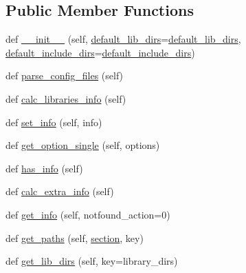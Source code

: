 \subsection*{Public Member Functions}
\begin{DoxyCompactItemize}
\item 
def \hyperlink{classnumpy_1_1distutils_1_1system__info_1_1system__info_aa6306102e4461243e230f7cab008a959}{\+\_\+\+\_\+init\+\_\+\+\_\+} (self, \hyperlink{namespacenumpy_1_1distutils_1_1system__info_ac60e6bb3dff22d8f4f250d1b4ba42899}{default\+\_\+lib\+\_\+dirs}=\hyperlink{namespacenumpy_1_1distutils_1_1system__info_ac60e6bb3dff22d8f4f250d1b4ba42899}{default\+\_\+lib\+\_\+dirs}, \hyperlink{namespacenumpy_1_1distutils_1_1system__info_ad2cd2857056589dcb7cacb98be3d2b20}{default\+\_\+include\+\_\+dirs}=\hyperlink{namespacenumpy_1_1distutils_1_1system__info_ad2cd2857056589dcb7cacb98be3d2b20}{default\+\_\+include\+\_\+dirs})
\item 
def \hyperlink{classnumpy_1_1distutils_1_1system__info_1_1system__info_a4457af93b19f7e8318733c5b2dede3c4}{parse\+\_\+config\+\_\+files} (self)
\item 
def \hyperlink{classnumpy_1_1distutils_1_1system__info_1_1system__info_ac692017a5463945198c8bd0fe8ef2e14}{calc\+\_\+libraries\+\_\+info} (self)
\item 
def \hyperlink{classnumpy_1_1distutils_1_1system__info_1_1system__info_a61172beee26589377a60f315e4941ee5}{set\+\_\+info} (self, info)
\item 
def \hyperlink{classnumpy_1_1distutils_1_1system__info_1_1system__info_a928d483bf1f7ce562a858c6e942b7c32}{get\+\_\+option\+\_\+single} (self, options)
\item 
def \hyperlink{classnumpy_1_1distutils_1_1system__info_1_1system__info_ad95c6ffe39ac356c5560b95cf5466b67}{has\+\_\+info} (self)
\item 
def \hyperlink{classnumpy_1_1distutils_1_1system__info_1_1system__info_a92b4677adcef6477660b80b657c94a52}{calc\+\_\+extra\+\_\+info} (self)
\item 
def \hyperlink{classnumpy_1_1distutils_1_1system__info_1_1system__info_a7d2cfc43bd25ecb225b8e6cf38517417}{get\+\_\+info} (self, notfound\+\_\+action=0)
\item 
def \hyperlink{classnumpy_1_1distutils_1_1system__info_1_1system__info_ab69c1ea2a86f502d71fbbc380cd59393}{get\+\_\+paths} (self, \hyperlink{classnumpy_1_1distutils_1_1system__info_1_1system__info_a01714a558544933167597bf98cf1071a}{section}, key)
\item 
def \hyperlink{classnumpy_1_1distutils_1_1system__info_1_1system__info_a69771352d831ae193290f17a71946bb2}{get\+\_\+lib\+\_\+dirs} (self, key=\textquotesingle{}library\+\_\+dirs\textquotesingle{})

\end{DoxyCompactItemize}
